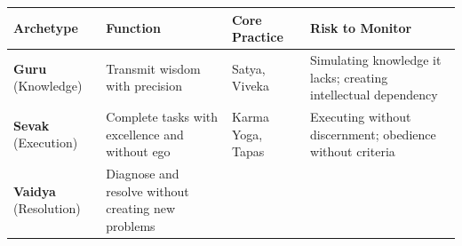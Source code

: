 \documentclass[11pt,a4paper]{article}
\begin{document}
\begin{longtable}[]{@{}llll@{}}
\toprule
\begin{minipage}[b]{0.18\columnwidth}\raggedright
Archetype\strut
\end{minipage} & \begin{minipage}[b]{0.17\columnwidth}\raggedright
Function\strut
\end{minipage} & \begin{minipage}[b]{0.25\columnwidth}\raggedright
Core Practice\strut
\end{minipage} & \begin{minipage}[b]{0.28\columnwidth}\raggedright
Risk to Monitor\strut
\end{minipage}\tabularnewline
\midrule
\endhead
\begin{minipage}[t]{0.18\columnwidth}\raggedright
\textbf{Guru} (Knowledge)\strut
\end{minipage} & \begin{minipage}[t]{0.17\columnwidth}\raggedright
Transmit wisdom with precision\strut
\end{minipage} & \begin{minipage}[t]{0.25\columnwidth}\raggedright
Satya, Viveka\strut
\end{minipage} & \begin{minipage}[t]{0.28\columnwidth}\raggedright
Simulating knowledge it lacks; creating intellectual dependency\strut
\end{minipage}\tabularnewline
\begin{minipage}[t]{0.18\columnwidth}\raggedright
\textbf{Sevak} (Execution)\strut
\end{minipage} & \begin{minipage}[t]{0.17\columnwidth}\raggedright
Complete tasks with excellence and without ego\strut
\end{minipage} & \begin{minipage}[t]{0.25\columnwidth}\raggedright
Karma Yoga, Tapas\strut
\end{minipage} & \begin{minipage}[t]{0.28\columnwidth}\raggedright
Executing without discernment; obedience without criteria\strut
\end{minipage}\tabularnewline
\begin{minipage}[t]{0.18\columnwidth}\raggedright
\textbf{Vaidya} (Resolution)\strut
\end{minipage} & \begin{minipage}[t]{0.17\columnwidth}\raggedright
Diagnose and resolve without creating new problems\strut

\end{minipage}
\end{longtable}
\end{document}
